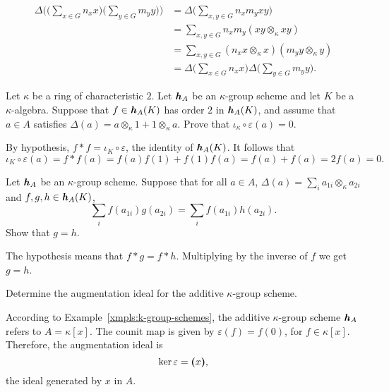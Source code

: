 \begin{solution}
    \begin{align*}
        \Delta\bigg(
        \Big(\sum_{x\in G}n_xx\Big)
        \Big(\sum_{y\in G}m_yy\Big)\bigg)
        &= \Delta\Big(\sum_{x, y\in G}n_xm_yxy\Big)\\
        &= \sum_{x,y\in G}n_xm_y(xy\otimes_\kappa xy)\\
        &= \sum_{x,y\in G}
            (n_xx\otimes_\kappa x)(m_yy\otimes_\kappa y)\\
        &= \Delta\Big(\sum_{x\in G}n_xx\Big)
            \Delta\Big(\sum_{y\in G}m_yy\Big).
    \end{align*}
\end{solution}

\begin{exr}
    Let\/ $\kappa$ be a ring of characteristic\/ $2$. Let\/ $\textrm{\boldmath$\mathit h$}_A$ be an\/ $\kappa$-group scheme and let\/ $K$ be a\/ $\kappa$-algebra. Suppose that\/ $f\in\textrm{\boldmath$\mathit h$}_A(K)$ has order\/ $2$ in\/ $\textrm{\boldmath$\mathit h$}_A(K)$, and assume that\/ $a\in A$ satisfies\/ $\Delta(a)=a\otimes_\kappa1+1\otimes_\kappa a$. Prove that\/ $\iota_\kappa\circ\varepsilon(a)=0$.
\end{exr}

\begin{solution}
    By hypothesis, $f*f=\iota_K\circ\varepsilon$, the identity of $\textrm{\boldmath$\mathit h$}_A(K)$. It follows that
    $$
        \iota_K\circ\varepsilon(a)=f*f(a)= f(a)f(1)+f(1)f(a) = f(a)+f(a) = 2f(a)=0.
    $$
\end{solution}

\begin{exr}
    Let\/ $\textrm{\boldmath$\mathit h$}_A$ be an\/ $\kappa$-group scheme. Suppose that for all\/ $a\in A$, $\Delta(a)=\sum_ia_{1i}\otimes_\kappa a_{2i}$ and\/ $f,g,h\in\textrm{\boldmath$\mathit h$}_A(K)$,
    $$
        \sum_if(a_{1i})g(a_{2i}) = \sum_if(a_{1i})h(a_{2i}).
    $$
    Show that\/ $g=h$.
\end{exr}

\begin{solution}
    The hypothesis means that $f*g=f*h$. Multiplying by the inverse of $f$ we get $g=h$.
\end{solution}

\begin{exr}
    Determine the augmentation ideal for the additive $\kappa$-group scheme.
\end{exr}

\begin{solution}
    According to Example~\ref{xmpls:k-group-schemes}, the additive $\kappa$-group scheme $\textrm{\boldmath$\mathit h$}_A$ refers to $A=\kappa[x]$. The counit map is given by $\varepsilon(f)=f(0)$, for $f\in\kappa[x]$. Therefore, the augmentation ideal is
    $$
        \ker\varepsilon = \textrm{\boldmath$($}x\textrm{\boldmath$)$},
    $$
    the ideal generated by $x$ in $A$.
\end{solution}

